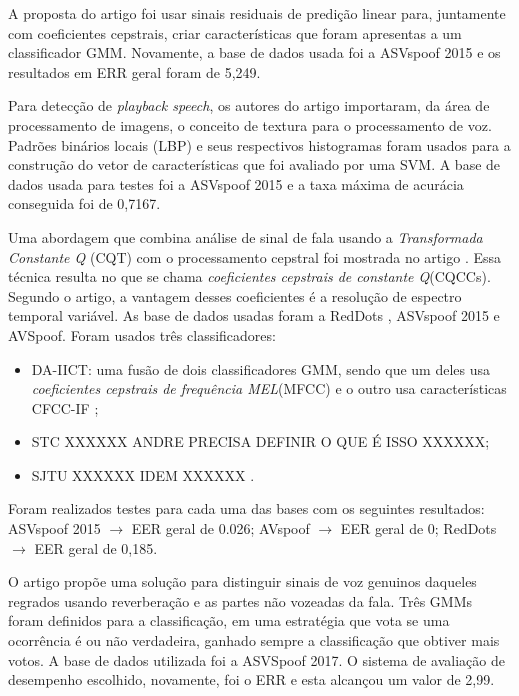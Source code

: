 		\par A proposta do artigo \cite{Hanilci2018} foi usar sinais residuais de predição linear para, juntamente com coeficientes cepstrais, criar características que foram apresentas a um classificador GMM. Novamente, a base de dados usada foi a ASVspoof 2015 e os resultados em ERR geral foram de 5,249.

		\par Para detecção de \textit{playback speech}, os autores do artigo  \cite{ISI:000473343500086} importaram, da área de processamento de imagens, o conceito de textura para o processamento de voz. Padrões binários locais (LBP) e seus respectivos histogramas foram usados para a construção do vetor de características que foi avaliado por uma SVM. A base de dados usada para testes foi a ASVspoof 2015 e a taxa máxima de acurácia conseguida foi de 0,7167.
		
		\par Uma abordagem que combina análise de sinal de fala usando a \textit{Transformada Constante Q} (CQT) com o processamento cepstral foi mostrada no artigo \cite{TODISCO2017516}. Essa técnica resulta no que se chama \textit{coeficientes cepstrais de constante Q}(CQCCs). Segundo o artigo, a vantagem desses coeficientes é a resolução de espectro temporal variável. As base de dados usadas foram a RedDots \cite{redDots}, ASVspoof 2015 e AVSpoof. Foram usados três classificadores:
		\begin{itemize}
			\item DA-IICT: uma fusão de dois classificadores GMM, sendo que um deles usa \textit{coeficientes cepstrais de frequência MEL}(MFCC) e o outro usa características CFCC-IF \cite{Patel2015};
			\item STC \cite{7472724} XXXXXX ANDRE PRECISA DEFINIR O QUE É ISSO XXXXXX;
			\item SJTU \cite{korshunov2016overview} XXXXXX IDEM XXXXXX .
		\end{itemize}			
		Foram realizados testes para cada uma das bases com os seguintes resultados: ASVspoof 2015 $\rightarrow$ EER geral de 0.026; AVspoof $\rightarrow$ EER geral de 0; RedDots $\rightarrow$ EER geral de 0,185.

		\par O artigo \cite{ISI:000490497200068} propõe uma solução para distinguir sinais de voz genuinos daqueles regrados usando reverberação e as partes não vozeadas da fala. Três GMMs foram definidos para a classificação, em uma estratégia que vota se uma ocorrência é ou não verdadeira, ganhado sempre a classificação que obtiver mais votos. A base de dados utilizada foi a ASVSpoof 2017. O sistema de avaliação de desempenho escolhido, novamente, foi o ERR e esta alcançou um valor de 2,99.
		
